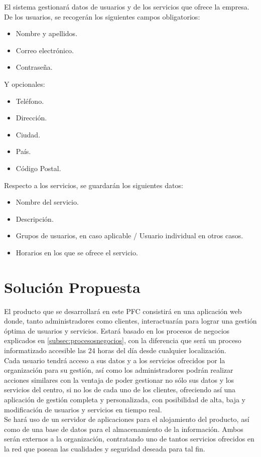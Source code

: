 El sistema gestionará datos de usuarios y de los servicios que ofrece la empresa. 
\\
De los usuarios, se recogerán los siguientes campos obligatorios: 

\begin{itemize}
\item Nombre y apellidos.
\item Correo electrónico.
\item Contraseña.
\end{itemize}

Y opcionales:

\begin{itemize}
\item Teléfono.
\item Dirección.
\item Ciudad.
\item País.
\item Código Postal.
\end{itemize}

Respecto a los servicios, se guardarán los siguientes datos: 

\begin{itemize}
\item Nombre del servicio.
\item Descripción.
\item Grupos de usuarios, en caso aplicable / Usuario individual en otros casos.
\item Horarios en los que se ofrece el servicio.
\end{itemize}



\section{Solución Propuesta}

El producto que se desarrollará en este PFC consistirá en una aplicación web donde, tanto administradores como clientes, interactuarán para lograr una gestión óptima de usuarios y servicios. Estará basado en los procesos de negocios explicados en \ref{subsec:procesosnegocios}, con la diferencia que será un proceso informatizado accesible las 24 horas del día desde cualquier localización. 
\\

Cada usuario tendrá acceso a sus datos y a los servicios ofrecidos por la organización para su gestión, así como los administradores podrán realizar acciones similares con la ventaja de poder gestionar no sólo sus datos y los servicios del centro, si no los de cada uno de los clientes, ofreciendo así una aplicación de gestión completa y personalizada, con posibilidad de alta, baja y modificación de usuarios y servicios en tiempo real.
\\

Se hará uso de un servidor de aplicaciones para el alojamiento del producto, así como de una base de datos para el almacenamiento de la información. Ambos serán externos a la organización, contratando uno de tantos servicios ofrecidos en la red que posean las cualidades y seguridad deseada para tal fin. 

